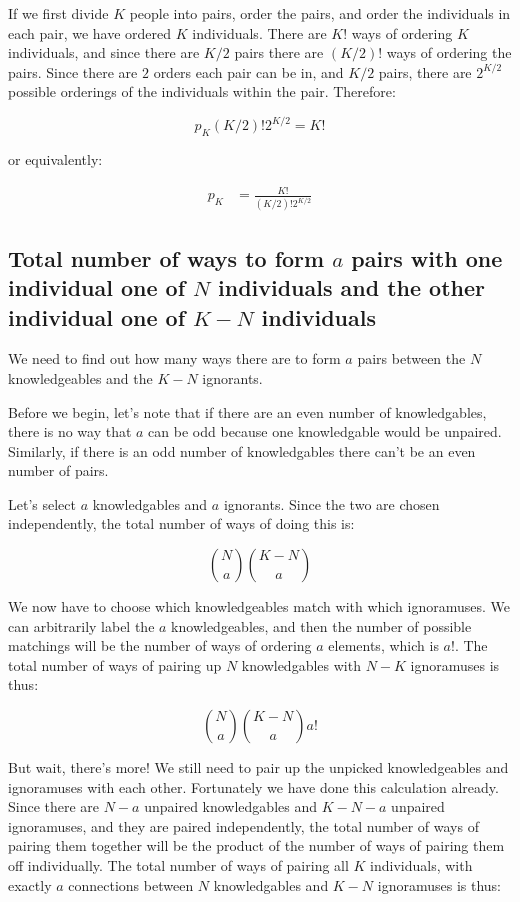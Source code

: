\documentclass{article}
\begin{document}
If we first divide $K$ people into pairs, order the pairs,
	and order the individuals in each pair,
	we have ordered $K$ individuals.
There are $K!$ ways of ordering $K$ individuals,
	and since there are $K/2$ pairs there are
	$(K/2)!$ ways of ordering the pairs.
Since there are $2$ orders each pair can be in, 
	and $K/2$ pairs, there are $2^{K/2}$
	possible orderings of the individuals within the pair.
Therefore:

\[ p_K (K/2)! 2^{K/2} = K! \]

or equivalently:

\begin{align}
p_K & = \frac{K!}{(K/2)! 2^{K/2}}
\end{align}

\subsection{Total number of ways to form $a$ pairs
	with one individual one of $N$ individuals and 
	the other individual one of $K-N$ individuals}

We need to find out how many ways there are to form $a$
	pairs between the $N$ knowledgeables and the $K-N$
	ignorants.

Before we begin, let's note that if there are an even number
	of knowledgables, there is no way that $a$ can be
	odd because one knowledgable would be unpaired.
Similarly, if there is an odd number of knowledgables
	there can't be an even number of pairs.

Let's select $a$ knowledgables
	and $a$ ignorants.
Since the two are chosen independently, the total number 
	of ways of doing this is:

\[ { N \choose a} {K - N \choose a} \]

We now have to choose which knowledgeables match with which
	ignoramuses.
We can arbitrarily label the $a$ knowledgeables, and then
	the number of possible matchings will be the number
	of ways of ordering $a$ elements, which is $a!$.
The total number of ways of pairing up $N$ knowledgables
	with $N-K$ ignoramuses is thus:

\[ {N \choose a} {K -N \choose a} a! \]

But wait, there's more!
We still need to pair up the unpicked knowledgeables and 
	ignoramuses with each other.
Fortunately we have done this calculation already.
Since there are $N-a$ unpaired knowledgables
	and $K-N-a$ unpaired ignoramuses,
	and they are paired independently,
	the total number of ways of pairing them together 
	will be the product of the number of ways 
	of pairing them off individually.
The total number of ways of pairing all $K$ individuals,
	with exactly  $a$ connections between $N$
	knowledgables and $K-N$ ignoramuses is thus:
\end{document}
